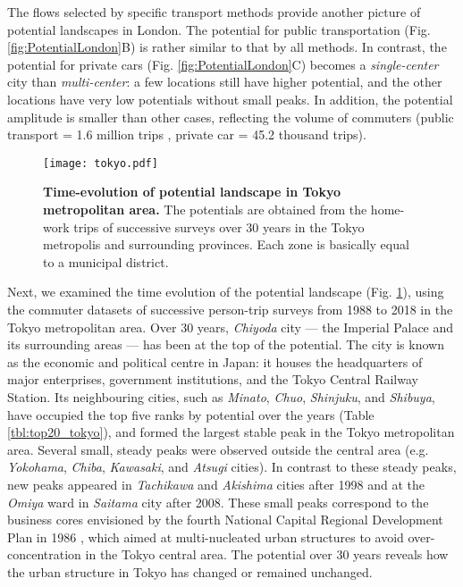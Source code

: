 \documentclass[]{article}
\begin{document}
The flows selected by specific transport methods provide another picture of potential landscapes in London.
The potential for public transportation (Fig. \ref{fig:PotentialLondon}B) is rather similar to that by all methods.
In contrast, the potential for private cars (Fig. \ref{fig:PotentialLondon}C) becomes a \textit{single-center} city than \textit{multi-center}:
a few locations still have higher potential, and the other locations have very low potentials without small peaks.
In addition, the potential amplitude is smaller than other cases, reflecting the volume of commuters (public transport = 1.6 million trips , private car = 45.2 thousand trips).



%
%
%
\begin{figure}[tbp]
  \texttt{[image: tokyo.pdf]}
  \caption{
    \textbf{Time-evolution of potential landscape  in Tokyo metropolitan area.} 
    The potentials are obtained from the home-work trips of successive surveys over 30 years in the Tokyo metropolis and surrounding provinces.
    Each  zone is basically equal to a municipal district.
  }
  \label{fig:PotentialTokyo}
\end{figure}

Next, we examined the time evolution of the potential landscape (Fig. \ref{fig:PotentialTokyo}),
using the commuter datasets of successive person-trip surveys from 1988 to 2018 in the Tokyo metropolitan area.
Over 30 years, \textit{Chiyoda} city --- the Imperial Palace and its surrounding areas ---  has been at the top of the potential.
The city is known as the economic and political centre in Japan:
it houses the headquarters of major enterprises, government institutions, and the Tokyo Central Railway Station.
%
%
Its neighbouring cities, such as \textit{Minato}, \textit{Chuo}, \textit{Shinjuku}, and \textit{Shibuya}, have occupied the top five ranks by potential over the years (Table \ref{tbl:top20_tokyo}), and formed the largest stable peak in the Tokyo metropolitan area.
Several small, steady peaks were observed outside the central area (e.g. \textit{Yokohama},  \textit{Chiba},  \textit{Kawasaki}, and \textit{Atsugi} cities).
In contrast to these steady peaks, new peaks appeared in \textit{Tachikawa} and \textit{Akishima} cities after 1998 and at the \textit{Omiya} ward in \textit{Saitama} city after 2008.
These small peaks correspond to the business cores envisioned by the fourth National Capital Regional Development Plan in 1986 \cite{Itsuki2006}, which aimed at multi-nucleated urban structures to avoid over-concentration in the Tokyo central area.
%
The potential over 30 years reveals how the urban structure in Tokyo has  changed or remained unchanged. 
\end{document}
